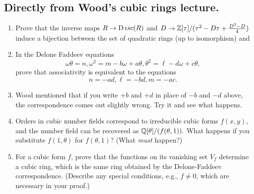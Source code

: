 \documentclass[12pt,amsfont]{amsart}
\begin{document}
\subsection{{\bf Directly from Wood's cubic rings lecture.}}
  \begin{enumerate}
  \item
  Prove that the inverse maps $R \rightarrow { {\operatorname Disc}}(R)$ and $D \rightarrow {\mathbb Z}[\tau] / (\tau^2 - D\tau + \frac{D^2 - D}{4})$ induce a bijection
  between the set of quadratic rings (up to isomorphism) and
  \item
  In the Delone Faddeev equations
  \[
  \omega \theta = n,  \omega^2 = m - b \omega + a \theta,  \theta^2 = \ell - d \omega + c \theta,
  \]
  prove that associativity is equivalent to the equations
  \[
  n = -ad,  \ell = -bd,  m = - ac.
  \]
  \item 
  Wood mentioned that if you write $+b$ and $+d$ in place of $-b$ and $-d$ above, the correspondence comes out slightly wrong. Try it and see what happens.
  \item
  Orders in cubic number fields correspond to irreducible cubic forms $f(x, y)$, and the number field can be recovered as ${\mathbb Q}[\theta] / (f (\theta, 1)).$
  What happens if you substitute $f( 1, \theta)$ for $f(\theta, 1)$? (What {\itshape must} happen?)
  \item
  For a cubic form $f$, prove that the functions on its vanishing set $V_f$ determine a cubic ring, which is the same ring obtained by the Delone-Faddeev
  correspondence. (Describe any special conditions, e.g., $f \neq 0$, which are necessary in your proof.)
  \end{enumerate} 
  
  
\end{document}
